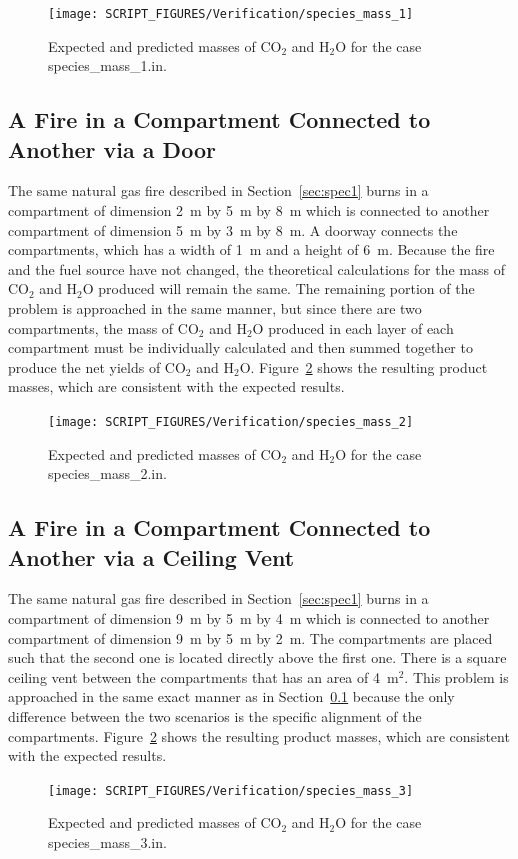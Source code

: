 \begin{figure}[!ht]
\centering
\texttt{[image: SCRIPT\_FIGURES/Verification/species\_mass\_1]}
\caption[Results of the test case {\ct species\_mass\_1.in}]{Expected and predicted masses of CO$_2$ and H$_2$O for the case {\ct species\_mass\_1.in}.}
\label{specmass1}
\end{figure}


\subsection{A Fire in a Compartment Connected to Another via a Door}
\label{sec:spec2}
\label{species_mass_2}

The same natural gas fire described in Section~\ref{sec:spec1} burns in a compartment of dimension 2~m by 5~m by 8~m which is connected to another compartment of dimension 5~m by 3~m by 8~m. A doorway connects the compartments, which has a width of 1~m and a height of 6~m. Because the fire and the fuel source have not changed, the theoretical calculations for the mass of CO$_2$ and H$_2$O produced will remain the same. The remaining portion of the problem is approached in the same manner, but since there are two compartments, the mass of CO$_2$ and H$_2$O produced in each layer of each compartment must be individually calculated and then summed together to produce the net yields of CO$_2$ and H$_2$O. Figure~\ref{specmass2} shows the resulting product masses, which are consistent with the expected results.
\begin{figure}[!ht]
\centering
\texttt{[image: SCRIPT\_FIGURES/Verification/species\_mass\_2]}
\caption[Results of the test case {\ct species\_mass\_1.in}]{Expected and predicted masses of CO$_2$ and H$_2$O for the case {\ct species\_mass\_2.in}.}
\label{specmass2}
\end{figure}

\subsection{A Fire in a Compartment Connected to Another via a Ceiling Vent}
\label{species_mass_3}

The same natural gas fire described in Section~\ref{sec:spec1} burns in a compartment of dimension 9~m by 5~m by 4~m which is connected to another compartment of dimension 9~m by 5~m by 2~m. The compartments are placed such that the second one is located directly above the first one. There is a square ceiling vent between the compartments that has an area of 4~m$^2$. This problem is approached in the same exact manner as in Section~\ref{sec:spec2} because the only difference between the two scenarios is the specific alignment of the compartments.
Figure~\ref{specmass2} shows the resulting product masses, which are consistent with the expected results.
\begin{figure}[!ht]
\centering
\texttt{[image: SCRIPT\_FIGURES/Verification/species\_mass\_3]}
\caption[Results of the test case {\ct species\_mass\_3.in}]{Expected and predicted masses of CO$_2$ and H$_2$O for the case {\ct species\_mass\_3.in}.}
\label{specmass3}
\end{figure}

